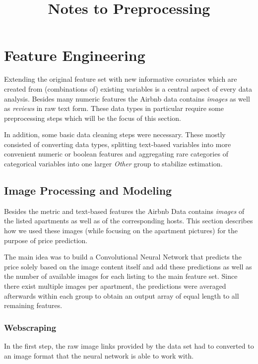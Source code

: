 \documentclass[12pt, letterpaper]{article}
\title{Notes to Preprocessing}
\author{}
\date{}
\begin{document}
\maketitle

\section{Feature Engineering}

Extending the original feature set with new informative covariates which are created from (combinations of) existing variables is a central aspect of every data analysis.
Besides many numeric features the Airbnb data contains \emph{images} as well as \emph{reviews} in raw text form.
These data types in particular require some preprocessing steps which will be the focus of this section.

In addition, some basic data cleaning steps were necessary.
These mostly consisted of converting data types, splitting text-based variables into more convenient numeric or boolean features and aggregating rare categories of categorical variables into one larger \emph{Other} group to stabilize estimation.

\subsection{Image Processing and Modeling}

Besides the metric and text-based features the Airbnb Data contains \emph{images} of the listed apartments as well as of the corresponding hosts.
This section describes how we used these images (while focusing on the apartment pictures) for the purpose of price prediction.

The main idea was to build a Convolutional Neural Network that predicts the price solely based on the image content itself and add these predictions as well as the number of available images for each listing to the main feature set.
Since there exist multiple images per apartment, the predictions were averaged afterwards within each group to obtain an output array of equal length to all remaining features.

\subsubsection{Webscraping}

In the first step, the raw image links provided by the data set had to converted to an image format that the neural network is able to work with.
\end{document}
